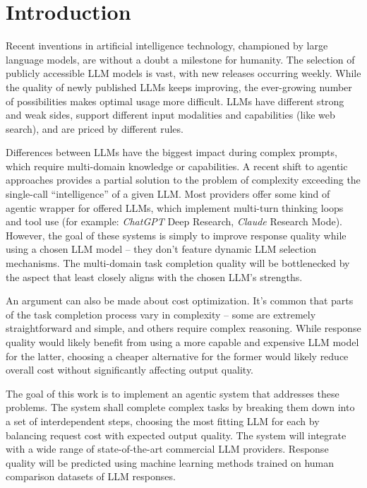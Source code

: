 \documentclass[a4paper,11pt,twoside]{report}
\theoremstyle{definition}
\begin{document}

\null\thispagestyle{empty}\newpage
\pagestyle{fancy}
\setcounter{page}{11}


\chapter{Introduction}

Recent inventions in artificial intelligence technology, championed by large language models, are without a doubt a milestone for humanity. The selection of publicly accessible LLM models is vast, with new releases occurring weekly. While the quality of newly published LLMs keeps improving, the ever-growing number of possibilities makes optimal usage more difficult. LLMs have different strong and weak sides, support different input modalities and capabilities (like web search), and are priced by different rules.

Differences between LLMs have the biggest impact during complex prompts, which require multi-domain knowledge or capabilities. A recent shift to agentic approaches provides a partial solution to the problem of complexity exceeding the single-call ``intelligence'' of a given LLM. Most providers offer some kind of agentic wrapper for offered LLMs, which implement multi-turn thinking loops and tool use (for example: \textit{ChatGPT} Deep Research, \textit{Claude} Research Mode). However, the goal of these systems is simply to improve response quality while using a chosen LLM model -- they don't feature dynamic LLM selection mechanisms. The multi-domain task completion quality will be bottlenecked by the aspect that least closely aligns with the chosen LLM's strengths. 

An argument can also be made about cost optimization. It's common that parts of the task completion process vary in complexity -- some are extremely straightforward and simple, and others require complex reasoning. While response quality would likely benefit from using a more capable and expensive LLM model for the latter, choosing a cheaper alternative for the former would likely reduce overall cost without significantly affecting output quality.

The goal of this work is to implement an agentic system that addresses these problems. The system shall complete complex tasks by breaking them down into a set of interdependent steps, choosing the most fitting LLM for each by balancing request cost with expected output quality. The system will integrate with a wide range of state-of-the-art commercial LLM providers. Response quality will be predicted using machine learning methods trained on human comparison datasets of LLM responses.
\end{document}
